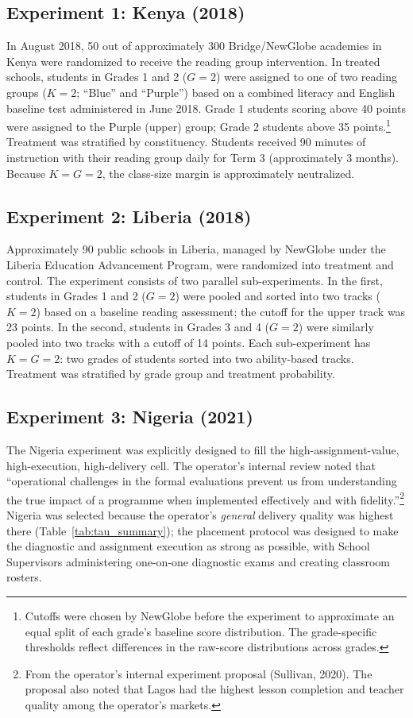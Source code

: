\documentclass[11pt]{article}
\begin{document}
\subsection{Experiment 1: Kenya (2018)}

In August 2018, 50 out of approximately 300 Bridge/NewGlobe academies in Kenya were randomized to receive the reading group intervention. In treated schools, students in Grades 1 and 2 ($G = 2$) were assigned to one of two reading groups ($K = 2$; ``Blue'' and ``Purple'') based on a combined literacy and English baseline test administered in June 2018. Grade 1 students scoring above 40 points were assigned to the Purple (upper) group; Grade 2 students above 35 points.\footnote{Cutoffs were chosen by NewGlobe before the experiment to approximate an equal split of each grade's baseline score distribution. The grade-specific thresholds reflect differences in the raw-score distributions across grades.} Treatment was stratified by constituency. Students received 90 minutes of instruction with their reading group daily for Term 3 (approximately 3 months). Because $K = G = 2$, the class-size margin is approximately neutralized.

\subsection{Experiment 2: Liberia (2018)}

Approximately 90 public schools in Liberia, managed by NewGlobe under the Liberia Education Advancement Program, were randomized into treatment and control. The experiment consists of two parallel sub-experiments. In the first, students in Grades 1 and 2 ($G = 2$) were pooled and sorted into two tracks ($K = 2$) based on a baseline reading assessment; the cutoff for the upper track was 23 points. In the second, students in Grades 3 and 4 ($G = 2$) were similarly pooled into two tracks with a cutoff of 14 points. Each sub-experiment has $K = G = 2$: two grades of students sorted into two ability-based tracks. Treatment was stratified by grade group and treatment probability.

\subsection{Experiment 3: Nigeria (2021)}

The Nigeria experiment was explicitly designed to fill the high-assignment-value, high-execution, high-delivery cell. The operator's internal review noted that ``operational challenges in the formal evaluations prevent us from understanding the true impact of a programme when implemented effectively and with fidelity.''\footnote{From the operator's internal experiment proposal (Sullivan, 2020). The proposal also noted that Lagos had the highest lesson completion and teacher quality among the operator's markets.} Nigeria was selected because the operator's \emph{general} delivery quality was highest there (Table~\ref{tab:tau_summary}); the placement protocol was designed to make the diagnostic and assignment execution as strong as possible, with School Supervisors administering one-on-one diagnostic exams and creating classroom rosters.
\end{document}
